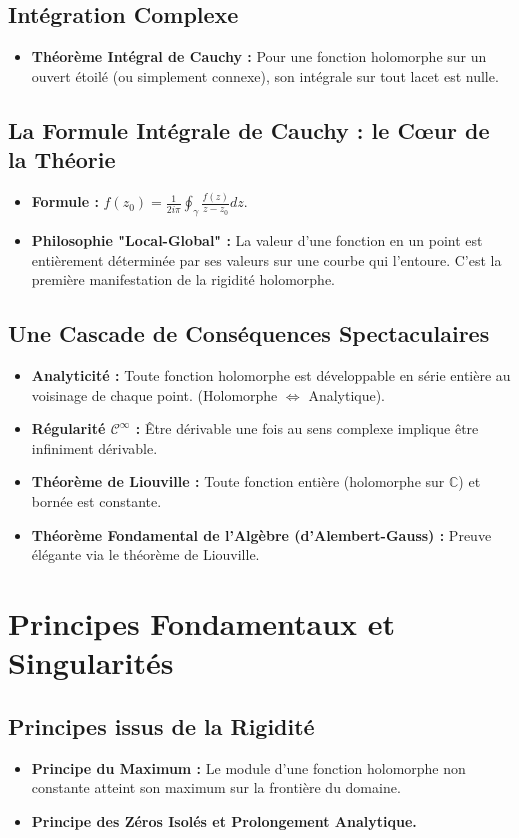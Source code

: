 \documentclass[12pt, a4paper, parskip=full]{report}
\theoremstyle{agregstyle}
\begin{document}
\subsection{Intégration Complexe}
\begin{itemize}
    \item \textbf{Théorème Intégral de Cauchy :} Pour une fonction holomorphe sur un ouvert étoilé (ou simplement connexe), son intégrale sur tout lacet est nulle.
\end{itemize}
\subsection{La Formule Intégrale de Cauchy : le Cœur de la Théorie}
\begin{itemize}
    \item \textbf{Formule :} $f(z_0) = \frac{1}{2i\pi} \oint_\gamma \frac{f(z)}{z-z_0} dz$.
    \item \textbf{Philosophie "Local-Global" :} La valeur d'une fonction en un point est entièrement déterminée par ses valeurs sur une courbe qui l'entoure. C'est la première manifestation de la rigidité holomorphe.
\end{itemize}
\subsection{Une Cascade de Conséquences Spectaculaires}
\begin{itemize}
    \item \textbf{Analyticité :} Toute fonction holomorphe est développable en série entière au voisinage de chaque point. (Holomorphe $\iff$ Analytique).
    \item \textbf{Régularité $\mathcal{C}^\infty$ :} Être dérivable une fois au sens complexe implique être infiniment dérivable.
    \item \textbf{Théorème de Liouville :} Toute fonction entière (holomorphe sur $\mathbb{C}$) et bornée est constante.
    \item \textbf{Théorème Fondamental de l'Algèbre (d'Alembert-Gauss) :} Preuve élégante via le théorème de Liouville.
\end{itemize}

\section{Principes Fondamentaux et Singularités}
\subsection{Principes issus de la Rigidité}
\begin{itemize}
    \item \textbf{Principe du Maximum :} Le module d'une fonction holomorphe non constante atteint son maximum sur la frontière du domaine.
    \item \textbf{Principe des Zéros Isolés et Prolongement Analytique.}
\end{itemize}
\end{document}
